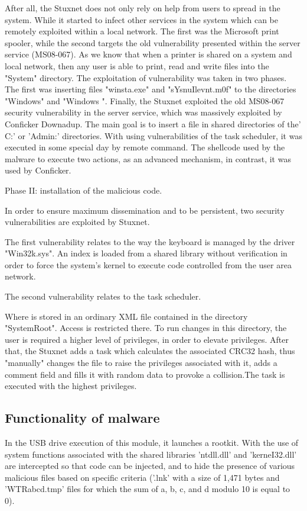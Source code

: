 \documentclass[conference]{IEEEtran}
\begin{document}
 After all, the Stuxnet does not only rely on help from users to spread in the system.  While it started to infect other services in the system which can be remotely exploited within a local network. The first was the Microsoft print spooler, while the second targets the old vulnerability presented within the server service (MS08-067). As we know that when a printer is shared on a system and local network, then any user is able to print, read and write files into the "System" directory. The exploitation of vulnerability was taken in two phases. The first was  inserting files "winsta.exe" and "sYsnuIlevnt.m0f" to the directories
"Windows" and "Windows\wbem
\mof". 
Finally, the Stuxnet exploited the old MS08-067 security vulnerability in the server service, which was massively exploited by Conficker Downadup. The main goal is to insert a file in shared directories of the' C:' or 'Admin:' directories. With using vulnerabilities of the task scheduler, it was executed in some special day by remote command. The shellcode used by the malware to execute two actions, as an advanced mechanism, in contrast, it was used by Conficker.



Phase II: installation of the malicious code.



 In order to ensure maximum dissemination and to be persistent, two security vulnerabilities are exploited by Stuxnet. 

The first vulnerability relates to the way the keyboard is managed by the driver "Win32k.sys". An index is loaded from a shared library without verification in order to force the system's kernel to execute code controlled from the user area network. 



The second vulnerability relates to the task scheduler.

Where is stored in an ordinary XML file
contained in the directory "SystemRoot\Task". Access  is restricted there. To run changes in this directory,  the user is required a higher level of privileges, in order to elevate privileges.  After that, the Stuxnet adds a task which calculates the associated CRC32 hash, thus "manually" changes the file to raise the privileges associated with it, adds a comment field and fills it with random data to provoke a collision.The task is executed with the highest privileges.

\subsection{Functionality of malware}
In the USB drive execution of this module, it launches a rootkit. With the use of system functions associated with the shared libraries 'ntdll.dll' and 'kerneI32.dll' are intercepted so that code can be injected, and to hide the presence of various malicious files based on specific criteria ('.lnk' with a size of 1,471 bytes and 'WTRabcd.tmp' files for which the sum of a, b, c, and d modulo 10 is equal to 0).
\end{document}
